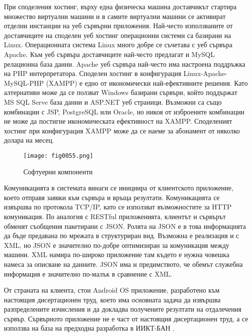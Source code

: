 При споделения хостинг, върху една физическа машина доставчикът стартира множество виртуални машини и в самите виртуални машини се активират отделни инстанции на уеб сървърни приложения. Най-често използваните от доставчиците на споделен уеб хостинг операционни системи са базирани на Linux. Операционната система Linux много добре се съчетава с уеб сървъра Apache. Към уеб сървъра доставчиците най-често предлагат и MySQL релационна база данни. Apache уеб сървъра най-често има настроена поддръжка на PHP интерпретатора. Споделен хостинг в конфигурация Linux-Apache-MySQL-PHP (XAMPP) е едно от икономически най-ефективните решения. Като алтернативи може да се ползват Windows базирани сървъри, който поддържат MS SQL Serve база данни и ASP.NET уеб страници. Възможни са също комбинации с JSP, PostgreSQL или Oracle, но никоя от изброените комбинации не може да постигне икономическата ефективност на XAMPP. Споделеният хостинг при конфигурация XAMPP може да се наеме за абонамент от няколко долара на месец. 

\begin{figure}[H]
  \centering
  \texttt{[image: fig0055.png]}
  \caption{Софтуерни компоненти}
\label{fig0055}
\end{figure}

Комуникацията в системата винаги се инициира от клиентското приложение, което отправя заявки към сървъра и връща резултати. Комуникацията се извършва по протокола TCP/IP, като се използват възможностите за HTTP комуникация. По аналогия с RESTful приложенията, клиентът и сървърът обменят съобщения пакетирани с JSON. Ролята на JSON е в това информацията да бъде предавана по мрежата в структуриран вид. Възможна е реализация и с XML, но JSON е значително по-добре оптимизиран за комуникация между машини. XML намира по-широко приложение там където е нужна човешка намеса за описване на данните. JSON има и предимството, че обемът служебна информация е значително по-малък в сравнение с XML. 

От страната на клиента, стои Android OS приложение, разработено към настоящия дисертационен труд, което има основната задача да извършва разпределените изчисления и да докладва получените резултати на отдалечения сървър. Сървърното приложение не е част от настоящия дисертационен труд, а се използва на база на предходна разработка в ИИКТ-БАН \cite{Balabanov-04}. 

